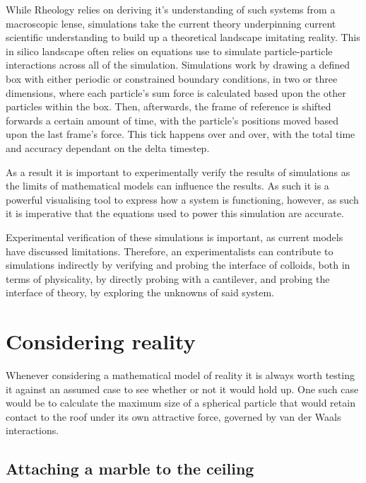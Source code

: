 While Rheology relies on deriving it's understanding of such systems from a macroscopic lense, simulations take the current theory underpinning current scientific understanding to build up a theoretical landscape imitating reality. This in silico landscape often relies on equations use to simulate particle-particle interactions across all of the simulation. Simulations work by drawing a defined box with either periodic or constrained boundary conditions, in two or three dimensions, where each particle's sum force is calculated based upon the other particles within the box. Then, afterwards, the frame of reference is shifted forwards a certain amount of time, with the particle's positions moved based upon the last frame's force. This tick happens over and over, with the total time and accuracy dependant on the delta timestep.\cite{foss_brady_2000}
 
As a result it is important to experimentally verify the results of simulations as the limits of mathematical models can influence the results. As such it is a powerful visualising tool to express how a system is functioning, however, as such it is imperative that the equations used to power this simulation are accurate. 

Experimental verification of these simulations is important, as current models have discussed limitations. Therefore, an experimentalists can contribute to simulations indirectly by verifying and probing the interface of colloids, both in terms of physicality, by directly probing with a cantilever, and probing the interface of theory, by exploring the unknowns of said system.

\cite{SmartMats, Rheo2}


\section{Considering reality}

Whenever considering a mathematical model of reality it is always worth testing it against an assumed case to see whether or not it would hold up. One such case would be to calculate the maximum size of a spherical particle that would retain contact to the roof under its own attractive force, governed by van der Waals interactions.

\subsection{Attaching a marble to the ceiling}

